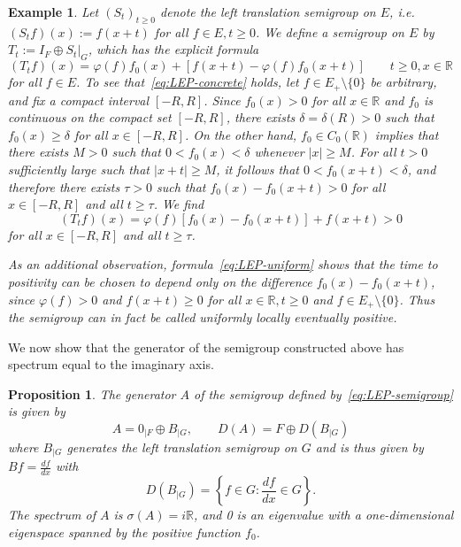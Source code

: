 \documentclass[sn-mathphys]{sn-jnl}%
\theoremstyle{thmstyleone}
\newtheorem{proposition}[theorem]{Proposition}
\theoremstyle{thmstylethree}
\newtheorem{example}[theorem]{Example}
\newcommand{\RR}{\mathbb{R}}
\begin{document}
\begin{example}
	Let $(S_t)_{t\ge 0}$ denote the left translation semigroup on $E$, i.e.\ $(S_t f)(x) := f(x+t)$ for all $f\in E, t\ge 0$. We define a semigroup on $E$ by $T_t := I_F \oplus S_t \vert_{G}$, which has the explicit formula
	\begin{equation}
		\label{eq:LEP-semigroup}
		(T_t f)(x) = \varphi(f)f_0(x) + [f(x+t) - \varphi(f) f_0(x+t)] \qquad t \ge 0, x\in\RR
	\end{equation}
	for all $f \in E$. To see that~\eqref{eq:LEP-concrete} holds, let $f \in E_+ \setminus\{0\}$ be arbitrary, and fix a compact interval $[-R, R]$. Since $f_0(x) > 0$ for all $x \in \RR$ and $f_0$ is continuous on the compact set $[-R, R]$, there exists $\delta=\delta(R) > 0$ such that $f_0(x) \ge\delta$ for all $x \in [-R, R]$. On the other hand, $f_0 \in C_0(\RR)$ implies that there exists $M > 0$ such that $0 < f_0(x) < \delta$ whenever $\lvert x\rvert \ge M$. For all $t > 0$ sufficiently large such that $\lvert x+t\rvert \ge M$, it follows that $0 < f_0(x+t) < \delta$, and therefore there exists $\tau > 0$ such that $f_0(x) - f_0(x+t) > 0$ for all $x \in [-R, R]$ and all $t\ge\tau$. We find
	\begin{equation}
		\label{eq:LEP-uniform}
		(T_t f)(x) = \varphi(f)[f_0(x) - f_0(x+t)] + f(x+t) > 0
	\end{equation}
	for all $x \in [-R,R]$ and all $t\ge\tau$. 
	
	As an additional observation, formula~\eqref{eq:LEP-uniform} shows that the time to positivity can be chosen to depend only on the difference $f_0(x)-f_0(x+t)$, since $\varphi(f)>0$ and $f(x+t) \ge 0$ for all $x\in\RR, t\ge 0$ and $f\in E_+\setminus\{0\}$. Thus the semigroup can in fact be called \emph{uniformly} locally eventually positive.
\end{example}

We now show that the generator of the semigroup constructed above has spectrum equal to the imaginary axis.
\begin{proposition}
	\label{prop:example-LEP-semigroup}
	The generator $A$ of the semigroup defined by~\eqref{eq:LEP-semigroup} is given by
	\begin{equation*}
		A = 0_{\vert F} \oplus B_{\vert G}, \qquad D(A) = F \oplus D(B_{\vert G})
	\end{equation*}
	where $B_{\vert G}$ generates the left translation semigroup on $G$ and is thus given by $Bf = \frac{df}{dx}$ with
	\begin{equation*}
		D(B_{\vert G}) = \left\{ f \in G : \frac{df}{dx} \in G \right\}.
	\end{equation*}
	The spectrum of $A$ is $\sigma(A) = i\RR$, and 0 is an eigenvalue with a one-dimensional eigenspace spanned by the positive function $f_0$.
\end{proposition}
\end{document}
